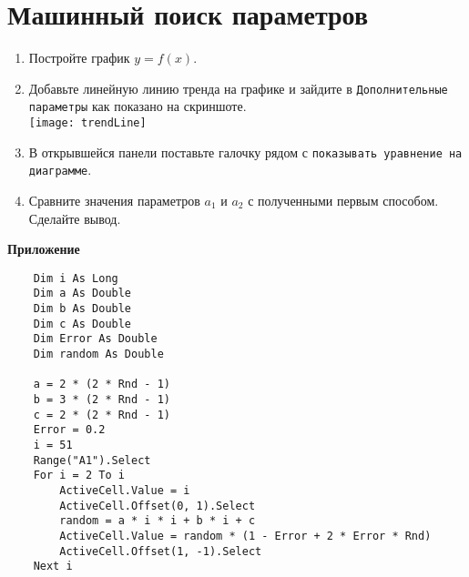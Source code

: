 \documentclass[14pt,a4paper]{article}
\begin{document}
\section{Машинный поиск параметров}
\begin{enumerate}
	\item Постройте график $y = f(x)$.
	\item Добавьте линейную линию тренда на графике и зайдите в \texttt{Дополнительные параметры} как показано на скриншоте.\\
	\texttt{[image: trendLine]}
	\item В открывшейся панели поставьте галочку рядом с \texttt{показывать уравнение на диаграмме}.
	\item Сравните значения параметров $a_1$ и $a_2$ с полученными первым способом. Сделайте вывод.
\end{enumerate}

\printbibliography[title={Литература}]	
\begin{center}
	\textbf{\Large Приложение}
\end{center}
	\renewcommand{\lstlistingname}{Листинг}
\begin{lstlisting}
	Dim i As Long
	Dim a As Double
	Dim b As Double
	Dim c As Double
	Dim Error As Double
	Dim random As Double

	a = 2 * (2 * Rnd - 1)
	b = 3 * (2 * Rnd - 1)
	c = 2 * (2 * Rnd - 1)
	Error = 0.2
	i = 51
	Range("A1").Select
	For i = 2 To i
		ActiveCell.Value = i
		ActiveCell.Offset(0, 1).Select
		random = a * i * i + b * i + c
		ActiveCell.Value = random * (1 - Error + 2 * Error * Rnd)
		ActiveCell.Offset(1, -1).Select
	Next i
	\end{lstlisting}
\end{document}
